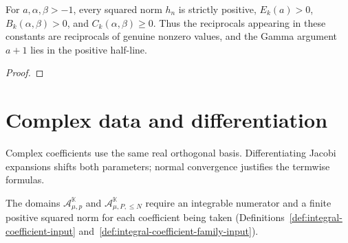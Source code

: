 \begin{supporting}

\begin{theorem}
\label{thm:jacobi-growth-constants}
\leanok
For $a,\alpha,\beta>-1$, every squared norm $h_n$ is strictly positive,
$E_k(a)>0$, $B_k(\alpha,\beta)>0$, and $C_k(\alpha,\beta)\ge0$.
Thus the reciprocals appearing in these constants are reciprocals of genuine
nonzero values, and the Gamma argument $a+1$ lies in the positive half-line.
\end{theorem}
\begin{proof}
\leanok
\end{proof}

\end{supporting}

\section{Complex data and differentiation}\label{sec:textbook-jacobi-approx-complex}

Complex coefficients use the same real orthogonal basis. Differentiating Jacobi expansions shifts both parameters; normal convergence justifies the termwise formulas.

The domains $\mathcal A_{\mu,p}^{\mathbb K}$ and $\mathcal A_{\mu,P,\le N}^{\mathbb K}$ require an integrable numerator and a finite positive squared norm for each coefficient being taken (Definitions~\ref{def:integral-coefficient-input} and~\ref{def:integral-coefficient-family-input}).

